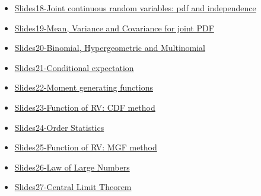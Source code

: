 \documentclass[
  letterpaper,
  DIV=11,
  numbers=noendperiod]{scrartcl}
\begin{document}
\begin{itemize}
{  discrete random variables: pdf and independence}
\item
  \href{https://luc-umass.github.io/pdf/NSlides25-18.pdf}{Slides18-Joint
  continuous random variables: pdf and independence}
\item
  \href{https://luc-umass.github.io/pdf/NSlides25-19.pdf}{Slides19-Mean,
  Variance and Covariance for joint PDF}
\item
  \href{https://luc-umass.github.io/pdf/NSlides25-20.pdf}{Slides20-Binomial,
  Hypergeometric and Multinomial}
\item
  \href{https://luc-umass.github.io/pdf/NSlides25-21.pdf}{Slides21-Conditional
  expectation}
\item
  \href{https://luc-umass.github.io/pdf/NSlides25-22.pdf}{Slides22-Moment
  generating functions}
\item
  \href{https://luc-umass.github.io/pdf/NSlides25-23.pdf}{Slides23-Function
  of RV: CDF method}
\item
  \href{https://luc-umass.github.io/pdf/NSlides25-24.pdf}{Slides24-Order
  Statistics}
\item
  \href{https://luc-umass.github.io/pdf/NSlides25-25.pdf}{Slides25-Function
  of RV: MGF method}
\item
  \href{https://luc-umass.github.io/pdf/NSlides25-26.pdf}{Slides26-Law
  of Large Numbers}
\item
  \href{https://luc-umass.github.io/pdf/NSlides25-27.pdf}{Slides27-Central
  Limit Theorem}
\end{itemize}
\end{document}
